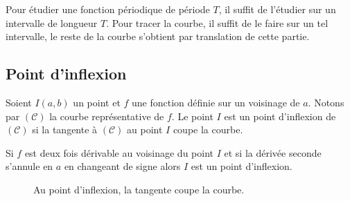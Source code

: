             Pour \'etudier une fonction p\'eriodique de p\'eriode $T$, 
            il suffit de l'\'etudier sur un intervalle de longueur $T$.
            Pour tracer la courbe, il suffit de le faire sur un tel intervalle,
            le reste de la courbe s'obtient par translation de cette partie.
      \subsection{Point d'inflexion}
            Soient $I(a,b)$ un point et $f$ une fonction d\'efinie sur un voisinage de $a$.
            Notons par $(\mathscr{C})$ la courbe repr\'esentative de $f$.
            Le point $I$ est un point d'inflexion de $(\mathscr{C})$ si 
            la tangente \`a $(\mathscr{C})$ au point $I$ coupe la courbe.
            
            Si $f$ est deux fois d\'erivable au voisinage du point $I$
            et si la d\'eriv\'ee seconde s'annule en $a$ en changeant de signe
            alors $I$ est un point d'inflexion.
                              \begin{figure}[h!t]
                              \centering
                              \caption{Au point d'inflexion, la tangente coupe la courbe.}
                              \label{fig:inflexion}
                              \end{figure}
